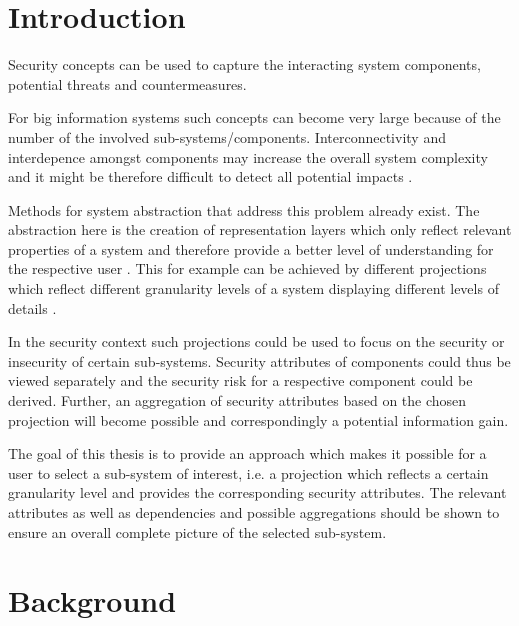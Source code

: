 \section{Introduction}

Security concepts can be used to capture the interacting system components, potential threats and countermeasures. 

For big information systems such concepts can become very large because of the number of the involved sub-systems/components. Interconnectivity and interdepence amongst components may increase the overall system complexity and it might be therefore difficult to detect all potential impacts \cite{branagan}.

Methods for system abstraction that address this problem already exist. The abstraction here is the creation of representation layers which only reflect relevant properties of a system and therefore provide a better level of understanding for the respective user \cite{pohl}. This for example can be achieved by different projections which reflect different granularity levels of a system displaying different levels of details \cite{thyssen2010system}.

In the security context such projections could be used to focus on the security or insecurity of certain sub-systems. Security attributes of components could thus be viewed separately and the security risk for a respective component could be derived. Further, an aggregation of security attributes based on the chosen projection will become possible and correspondingly a potential information gain.

The goal of this thesis is to provide an approach which makes it possible for a user to select a sub-system of interest, i.e. a projection which reflects a certain granularity level and provides the corresponding security attributes. The relevant attributes as well as dependencies and possible aggregations should be shown to ensure an overall complete picture of the selected sub-system. 


\section{Background}